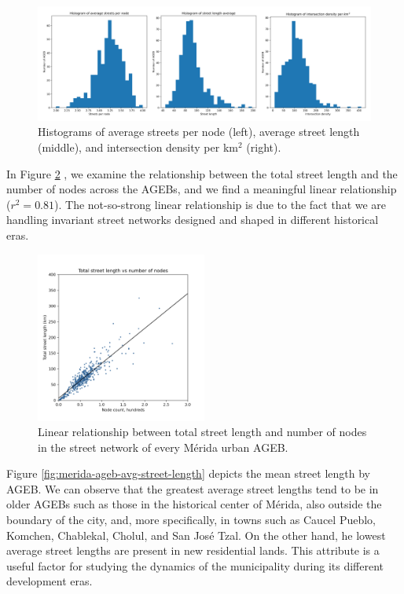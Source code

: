 \begin{figure}[h!]
	\centering
	\includegraphics[width=\textwidth]{Figures/merida-ageb-histograms.png}
	\caption{Histograms of average streets per node (left), average street length (middle), and intersection density per km$^2$ (right).
		\label{fig:merida-ageb-histograms}}
\end{figure}

In Figure \ref{fig:merida-ageb-street-length-vs-nodes} , we examine the relationship between the total street length and the number of nodes across the AGEBs, and we find a meaningful linear relationship ($r^2 = 0.81$). The not-so-strong linear relationship is due to the fact that we are handling invariant street networks designed and shaped in different historical eras.

\begin{figure}[h!]
	\centering
	\includegraphics[width=0.5\textwidth]{Figures/merida-ageb-street-length-vs-nodes.png}
	\caption{Linear relationship between total street length and number of nodes in the street network of every Mérida urban AGEB.
		\label{fig:merida-ageb-street-length-vs-nodes}}
\end{figure}

Figure \ref{fig:merida-ageb-avg-street-length} depicts the mean street length by AGEB. We can observe that the greatest average street lengths tend to be in older AGEBs such as those in the historical center of Mérida, also outside the boundary of the city, and, more specifically, in towns such as Caucel Pueblo, Komchen, Chablekal, Cholul, and San José Tzal. On the other hand, he lowest average street lengths are present in new residential lands. This attribute is a useful factor for studying the dynamics of the municipality during its different development eras.

